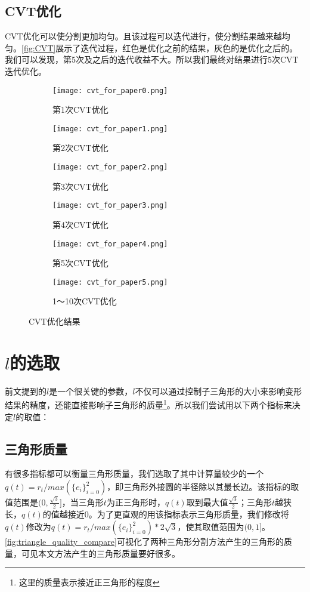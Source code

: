 \subsection{CVT优化}
CVT\cite{du1999}优化可以使分割更加均匀。且该过程可以迭代进行，使分割结果越来越均匀。\autoref{fig:CVT}展示了迭代过程，红色是优化之前的结果，灰色的是优化之后的。我们可以发现，第5次及之后的迭代收益不大。所以我们最终对结果进行5次CVT迭代优化。

\begin{figure}[htbp]
	\centering
	\begin{subfigure}[b]{.49\textwidth}
		\centering
		\texttt{[image: cvt\_for\_paper0.png]}
		\caption{第1次CVT优化}
	\end{subfigure}
	\begin{subfigure}[b]{.49\textwidth}
		\centering
		\texttt{[image: cvt\_for\_paper1.png]}
		\caption{第2次CVT优化}
	\end{subfigure}

	\begin{subfigure}[b]{.49\textwidth}
		\centering
		\texttt{[image: cvt\_for\_paper2.png]}
		\caption{第3次CVT优化}
	\end{subfigure}
	\begin{subfigure}[b]{.49\textwidth}
		\centering
		\texttt{[image: cvt\_for\_paper3.png]}
		\caption{第4次CVT优化}
	\end{subfigure}

	\begin{subfigure}[b]{.49\textwidth}
		\centering
		\texttt{[image: cvt\_for\_paper4.png]}
		\caption{第5次CVT优化}
	\end{subfigure}
	\begin{subfigure}[b]{.49\textwidth}
		\centering
		\texttt{[image: cvt\_for\_paper5.png]}
		\caption{1～10次CVT优化}
	\end{subfigure}
    \caption{CVT优化结果} \label{fig:CVT}
\end{figure}

\section{$l$的选取}
前文提到的$l$是一个很关键的参数，$l$不仅可以通过控制子三角形的大小来影响变形结果的精度，还能直接影响子三角形的质量\footnote{这里的质量表示接近正三角形的程度}。所以我们尝试用以下两个指标来决定$l$的取值：

\subsection{三角形质量}
有很多指标都可以衡量三角形质量\cite{pebay2003}，我们选取了其中计算量较少的一个$q(t)=r_t/max(\{e_i\}^{2}_{i=0})$，即三角形外接圆的半径除以其最长边。该指标的取值范围是$(0, \frac{\sqrt{3}}{2}]$，当三角形$t$为正三角形时，$q(t)$取到最大值$\frac{\sqrt{3}}{2}$；三角形$t$越狭长，$q(t)$的值越接近0。为了更直观的用该指标表示三角形质量，我们修改将$q(t)$修改为$q(t)=r_t/max(\{e_i\}^{2}_{i=0})*2\sqrt{3}$，使其取值范围为$(0, 1]$。\autoref{fig:triangle_quality_compare}可视化了两种三角形分割方法产生的三角形的质量，可见本文方法产生的三角形质量要好很多。

